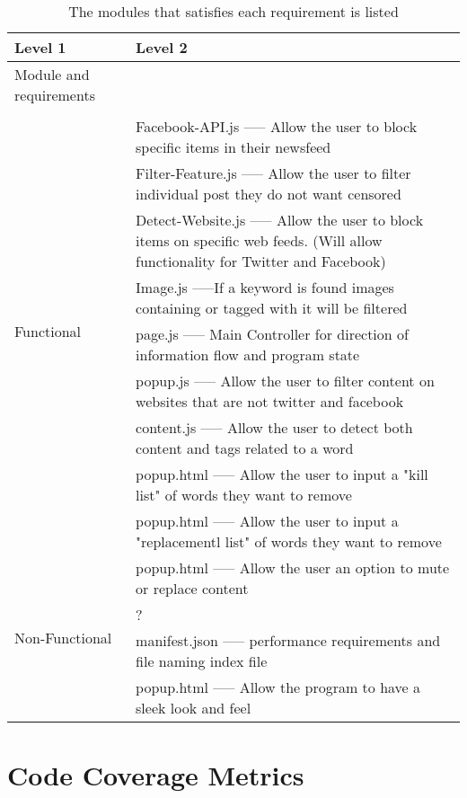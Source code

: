 \documentclass[12pt, titlepage]{article}
\begin{document}
\begin{table}[H]
\centering
\begin{tabular}{p{} p{}}
\toprule
\textbf{Level 1} & \textbf{Level 2}\\
\midrule
{Module and requirements} & ~ \\
\midrule
\multirow{10}{0.3\textwidth}{Functional}\\
& Facebook-API.js ----- Allow the user to block specific items in their newsfeed\\
&Filter-Feature.js ----- Allow the user to filter individual post they do not want censored\\
&Detect-Website.js ----- Allow the user to block items on specific web feeds. (Will allow functionality for Twitter and Facebook)\\
&Image.js -----If a keyword is found images containing or tagged with it will be filtered\\
& page.js ----- Main Controller for direction of information flow and program state\\
& popup.js ----- Allow the user to filter content on websites that are not twitter and facebook\\
& content.js ----- Allow the user to detect both content and tags related to a word\\
& popup.html ----- Allow the user to input a "kill list" of words they want to remove\\
& popup.html ----- Allow the user to input a "replacementl list" of words they want to remove\\
& popup.html ----- Allow the user an option to mute or replace content\\
\midrule
\multirow{2}{0.3\textwidth}{Non-Functional} & {?}\\
& manifest.json ----- performance requirements and file naming index file\\
& popup.html ----- Allow the program to have a sleek look and feel\\

\bottomrule
\end{tabular}
\caption{The modules that satisfies each requirement is listed}
\label{TblMH}
\end{table}
		
\section{Code Coverage Metrics}
\end{document}
